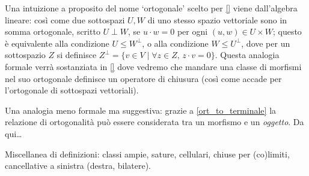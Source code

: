 \begin{remark}\label{perche_ortogonale}

	Una intuizione a proposito del nome `ortogonale' scelto per \ref{} viene dall'algebra lineare: così come due sottospazi \(U,W\) di uno stesso spazio vettoriale sono in somma ortogonale, scritto \(U\perp W\), se \(u\cdot w=0\) per ogni \((u,w)\in U\times W\); questo è equivalente alla condizione \(U\le W^\perp\), o alla condizione \(W\le U^\perp\), dove per un sottospazio \(Z\) si definisce \(Z^\perp = \{v\in V\mid \forall z\in Z,\,z\cdot v=0\}\). Questa analogia formale verrà sostanziata in \ref{} dove vedremo che mandare una classe di morfismi nel suo ortogonale definisce un operatore di chiusura (così come accade per l'ortogonale di sottospazi vettoriali).

	Una analogia meno formale ma suggestiva: grazie a \ref{ort_to_terminale} la relazione di ortogonalità può essere considerata tra un morfismo e un \emph{oggetto}. Da qui\dots
\end{remark}
Miscellanea di definizioni: classi ampie, sature, cellulari, chiuse per (co)limiti, cancellative a sinistra (destra, bilatere).
